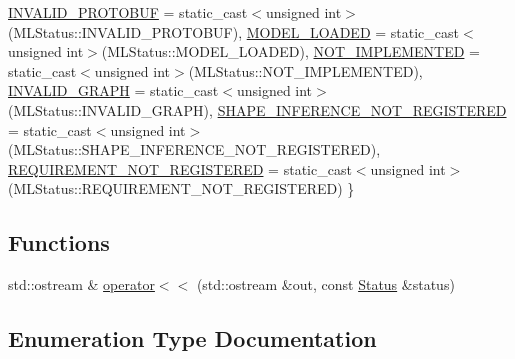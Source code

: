 \begin{DoxyCompactItemize}
\mbox{\hyperlink{namespaceonnxruntime_1_1common_a9dd72ac7df927aa93801eceb7e06fd2ba29227b10a2986e5dba2ecdb7ddbbd0ca}{I\+N\+V\+A\+L\+I\+D\+\_\+\+P\+R\+O\+T\+O\+B\+UF}} = static\+\_\+cast$<$unsigned int$>$(M\+L\+Status\+:\+:I\+N\+V\+A\+L\+I\+D\+\_\+\+P\+R\+O\+T\+O\+B\+UF), 
\newline
\mbox{\hyperlink{namespaceonnxruntime_1_1common_a9dd72ac7df927aa93801eceb7e06fd2ba0cbb22e2ce1301c7b76364eecc72ee6d}{M\+O\+D\+E\+L\+\_\+\+L\+O\+A\+D\+ED}} = static\+\_\+cast$<$unsigned int$>$(M\+L\+Status\+:\+:M\+O\+D\+E\+L\+\_\+\+L\+O\+A\+D\+ED), 
\mbox{\hyperlink{namespaceonnxruntime_1_1common_a9dd72ac7df927aa93801eceb7e06fd2ba90df21990fe0afe17ae348264825babb}{N\+O\+T\+\_\+\+I\+M\+P\+L\+E\+M\+E\+N\+T\+ED}} = static\+\_\+cast$<$unsigned int$>$(M\+L\+Status\+:\+:N\+O\+T\+\_\+\+I\+M\+P\+L\+E\+M\+E\+N\+T\+ED), 
\mbox{\hyperlink{namespaceonnxruntime_1_1common_a9dd72ac7df927aa93801eceb7e06fd2badde3cc9ff31c0b963beb617b40432638}{I\+N\+V\+A\+L\+I\+D\+\_\+\+G\+R\+A\+PH}} = static\+\_\+cast$<$unsigned int$>$(M\+L\+Status\+:\+:I\+N\+V\+A\+L\+I\+D\+\_\+\+G\+R\+A\+PH), 
\mbox{\hyperlink{namespaceonnxruntime_1_1common_a9dd72ac7df927aa93801eceb7e06fd2baa543dbaa2002e6d511a0730d11150c81}{S\+H\+A\+P\+E\+\_\+\+I\+N\+F\+E\+R\+E\+N\+C\+E\+\_\+\+N\+O\+T\+\_\+\+R\+E\+G\+I\+S\+T\+E\+R\+ED}} = static\+\_\+cast$<$unsigned int$>$(M\+L\+Status\+:\+:S\+H\+A\+P\+E\+\_\+\+I\+N\+F\+E\+R\+E\+N\+C\+E\+\_\+\+N\+O\+T\+\_\+\+R\+E\+G\+I\+S\+T\+E\+R\+ED), 
\newline
\mbox{\hyperlink{namespaceonnxruntime_1_1common_a9dd72ac7df927aa93801eceb7e06fd2ba63262ca46a0d3fd276c728a02e91d7ba}{R\+E\+Q\+U\+I\+R\+E\+M\+E\+N\+T\+\_\+\+N\+O\+T\+\_\+\+R\+E\+G\+I\+S\+T\+E\+R\+ED}} = static\+\_\+cast$<$unsigned int$>$(M\+L\+Status\+:\+:R\+E\+Q\+U\+I\+R\+E\+M\+E\+N\+T\+\_\+\+N\+O\+T\+\_\+\+R\+E\+G\+I\+S\+T\+E\+R\+ED)
 \}
\end{DoxyCompactItemize}
\subsection*{Functions}
\begin{DoxyCompactItemize}
\item 
std\+::ostream \& \mbox{\hyperlink{namespaceonnxruntime_1_1common_afdb6e3abd4b0273234996893794c5c64}{operator$<$$<$}} (std\+::ostream \&out, const \mbox{\hyperlink{classonnxruntime_1_1common_1_1Status}{Status}} \&status)
\end{DoxyCompactItemize}


\subsection{Enumeration Type Documentation}
\mbox{\label{namespaceonnxruntime_1_1common_afab40a94a5b6b651a1c24921d4e5c4d5}} 
